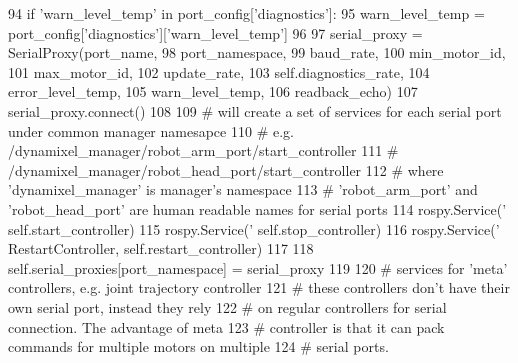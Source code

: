 \begin{DoxyCode}
94                 \textcolor{keywordflow}{if} \textcolor{stringliteral}{'warn\_level\_temp'} \textcolor{keywordflow}{in} port\_config[\textcolor{stringliteral}{'diagnostics'}]:
95                     warn\_level\_temp = port\_config[\textcolor{stringliteral}{'diagnostics'}][\textcolor{stringliteral}{'warn\_level\_temp'}]
96                     
97             serial\_proxy = SerialProxy(port\_name,
98                                        port\_namespace,
99                                        baud\_rate,
100                                        min\_motor\_id,
101                                        max\_motor\_id,
102                                        update\_rate,
103                                        self.diagnostics\_rate,
104                                        error\_level\_temp,
105                                        warn\_level\_temp,
106                                        readback\_echo)
107             serial\_proxy.connect()
108             
109             \textcolor{comment}{# will create a set of services for each serial port under common manager namesapce}
110             \textcolor{comment}{# e.g. /dynamixel\_manager/robot\_arm\_port/start\_controller}
111             \textcolor{comment}{#      /dynamixel\_manager/robot\_head\_port/start\_controller}
112             \textcolor{comment}{# where 'dynamixel\_manager' is manager's namespace}
113             \textcolor{comment}{#       'robot\_arm\_port' and 'robot\_head\_port' are human readable names for serial ports}
114             rospy.Service(\textcolor{stringliteral}{'%
      self.start\_controller)
115             rospy.Service(\textcolor{stringliteral}{'%
      self.stop\_controller)
116             rospy.Service(\textcolor{stringliteral}{'%
      RestartController, self.restart\_controller)
117             
118             self.serial\_proxies[port\_namespace] = serial\_proxy
119             
120         \textcolor{comment}{# services for 'meta' controllers, e.g. joint trajectory controller}
121         \textcolor{comment}{# these controllers don't have their own serial port, instead they rely}
122         \textcolor{comment}{# on regular controllers for serial connection. The advantage of meta}
123         \textcolor{comment}{# controller is that it can pack commands for multiple motors on multiple}
124         \textcolor{comment}{# serial ports.}
}}}
\end{DoxyCode}
